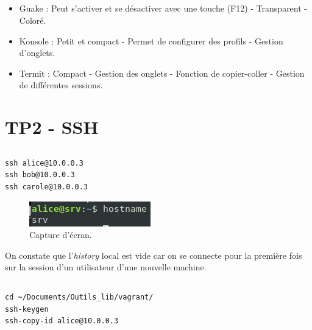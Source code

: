 \documentclass{article}
\begin{document}
\subsection{}

\begin{itemize}
    \item Guake :
Peut s’activer et se désactiver avec une touche (F12) -
Transparent -
Coloré.
\item Konsole :
Petit et compact -
Permet de configurer des profils -
Gestion d'onglets.
\item Termit :
Compact -
Gestion des onglets -
Fonction de copier-coller -
Gestion de différentes sessions.
\end{itemize}

\newpage
\section{TP2 - SSH}

\subsection{}

\begin{lstlisting}
ssh alice@10.0.0.3
ssh bob@10.0.0.3
ssh carole@10.0.0.3
\end{lstlisting}

\begin{figure}[h]
\centering
\includegraphics[width=\textwidth]{images/q2-1.jpg}
\caption{\label{fig:frog}Capture d'écran.}
\end{figure}

\FloatBarrier

On constate que l'\emph{history} local est vide car on se connecte pour la première fois sur la session d'un utilisateur d'une nouvelle machine.

\subsection{}

\begin{lstlisting}
cd ~/Documents/Outils_lib/vagrant/
ssh-keygen
ssh-copy-id alice@10.0.0.3
\end{lstlisting}
\end{document}
